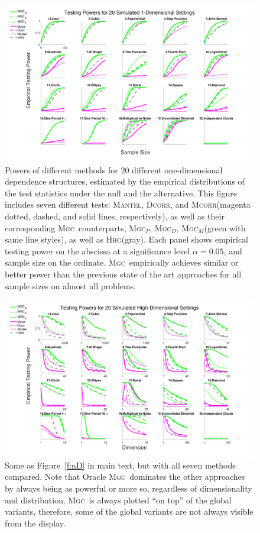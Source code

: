 \documentclass[11pt]{article}
\providecommand{\sct}[1]{{\normalfont\textsc{#1}}}
\newcommand{\Mgc}{\sct{Mgc}}
\newcommand{\Mgcp}{\sct{Mgc$_P$}}
\newcommand{\Mgcd}{\sct{Mgc$_D$}}
\newcommand{\Mgcm}{\sct{Mgc$_M$}}
\newcommand{\Hhg}{\sct{Hhg}}
\newcommand{\Dcorr}{\sct{Dcorr}}
\newcommand{\Mcorr}{\sct{Mcorr}}
\newcommand{\Mantel}{\sct{Mantel}}
\begin{document}
\begin{figure}[htbp]
\includegraphics[width=1.0\textwidth]{Figures/Fig1DPowerAll}
\caption{
Powers of different methods for $20$ different one-dimensional dependence structures, estimated by the empirical distributions of the test statistics under the null and the alternative.
This figure includes seven different tests: \Mantel, \Dcorr, and \Mcorr (magenta dotted, dashed, and solid lines, respectively), as well as their corresponding \Mgc~counterparts, \Mgcp, \Mgcd, \Mgcm (green with same line styles), as well as \Hhg (gray).
Each panel shows empirical testing power on the abscissa at a significance level $\alpha=0.05$, and sample size on the ordinate.
\Mgc~empirically achieves similar or better power than the previous state of the art approaches for all sample sizes on almost all problems.}
\label{f:1DAll}
\end{figure}

\begin{figure}[htbp]
\includegraphics[width=1.0\textwidth]{Figures/FigHDPowerAll}
\caption{
Same as Figure~\ref{f:nD} in main text, but with all seven methods compared. Note that Oracle \Mgc~dominates the other approaches by always being as powerful or more so, regardless of dimensionality and distribution. \Mgc~is always plotted ``on top'' of the global variants, therefore, some of the global variants are not always visible from the display.}
\label{f:nDAll}
\end{figure}
\end{document}
